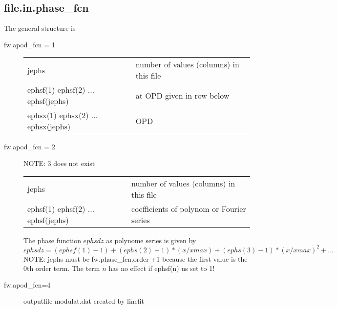 \documentclass[a4paper]{article}
\begin{document}
\subsection{file.in.phase\_fcn}

The general structure is
\begin{description}
\item[fw.apod\_fcn = 1]\hspace{2cm}
  
  \noindent
  \begin{tabular}{ll}  
    jephs & number of values (columns) in this file\\
    ephsf(1) ephsf(2) ... ephsf(jephs)& at OPD given in row below\\
    ephsx(1) ephsx(2) ... ephsx(jephs) & OPD\\
  \end{tabular}
\item[fw.apod\_fcn = 2] NOTE: 3 does not exist
  
  \noindent
  \begin{tabular}{ll}  
    jephs & number of values (columns) in this file\\
    ephsf(1) ephsf(2) ... ephsf(jephs)& coefficients of polynom or Fourier series\\
  \end{tabular}
  The phase  function $ephsdz$ as polynome series is given by
\begin{equation}
  ephsdz = (ephsf(1) -1) + (ephs(2)-1)*(x/xmax) + (ephs(3)-1)*(x/xmax)^2 + \ldots
\end{equation}
  NOTE: jephs must be fw.phase\_fcn.order +1 because the first value
  is the 0th order term. The term $n$ has no effect if ephsf(n) us set to 1!
  
\item[fw.apod\_fcn=4] outputfile modulat.dat created by linefit
\end{description}
\end{document}
